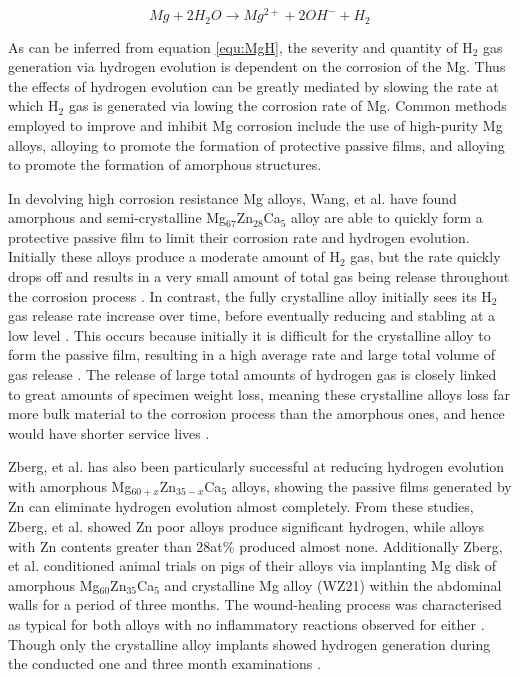 \documentclass[draft,a4paper,12pt,oneside]{report}%
\begin{document}
\begin{equation}
Mg + 2H_{2}O \rightarrow Mg^{2+} + 2OH^{-} + H_{2}
\label{equ:MgH}
\end{equation}

As can be inferred from equation \ref{equ:MgH}, the severity and quantity of H$_{2}$ gas generation via hydrogen evolution is dependent on the corrosion of the Mg. Thus the effects of hydrogen evolution can be greatly mediated by slowing the rate at which H$_{2}$ gas is generated via lowing the corrosion rate of Mg.  Common methods employed to improve and inhibit Mg corrosion include the use of high-purity Mg alloys, alloying to promote the formation of protective passive films, and alloying to promote the formation of amorphous structures. 

In devolving high corrosion resistance Mg alloys, Wang, et al. \cite{Wang2012} have found amorphous and semi-crystalline Mg$_{67}$Zn$_{28}$Ca$_{5}$  alloy are able to quickly form a protective passive film to limit their corrosion rate and hydrogen evolution. Initially these alloys produce a moderate amount of H$_{2}$ gas, but the rate quickly drops off and results in a very small amount of total gas being release throughout the corrosion process \cite{Wang2012}. In contrast, the fully crystalline alloy initially sees its H$_{2}$ gas release rate increase over time, before eventually reducing and stabling at a low level \cite{Wang2012}. This occurs because initially it is difficult for the crystalline alloy to form the passive film, resulting in a high average rate and large total volume of gas release \cite{Wang2012}. The release of large total amounts of hydrogen gas is closely linked to great amounts of specimen weight loss, meaning these crystalline alloys loss far more bulk material to the corrosion process than the amorphous ones, and hence would have shorter service lives \cite{Wang2012}. 

Zberg, et al. \cite{Zberg2009} has also been particularly successful at reducing hydrogen evolution with amorphous Mg$_{60+x}$Zn$_{35-x}$Ca$_{5}$ alloys, showing the passive films generated by Zn can eliminate hydrogen evolution almost completely. From these studies, Zberg, et al. \cite{Zberg2009} showed Zn poor alloys produce significant hydrogen, while alloys with Zn contents greater than 28at\% produced almost none. Additionally Zberg, et al. \cite{Zberg2009} conditioned animal trials on pigs of their alloys via implanting Mg disk of amorphous Mg$_{60}$Zn$_{35}$Ca$_{5}$ and crystalline Mg alloy (WZ21) within the abdominal walls for a period of three months. The wound-healing process was characterised as typical for both alloys with no inflammatory reactions observed for either \cite{Zberg2009}. Though only the crystalline alloy implants showed hydrogen generation during the conducted one and three month examinations \cite{Zberg2009}.
\end{document}
